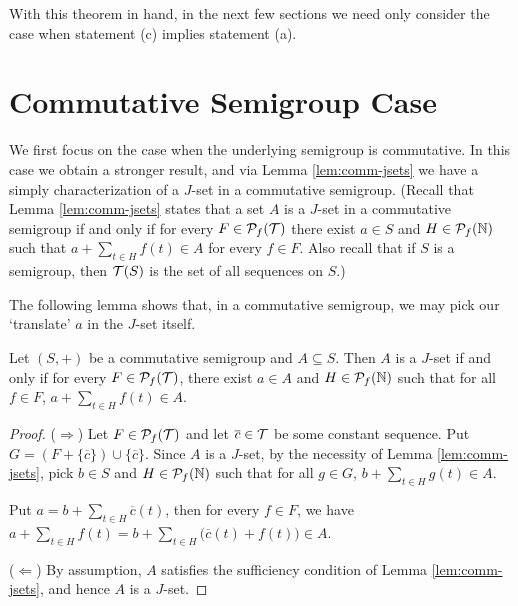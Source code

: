 With this theorem in hand, in the next few sections we need only consider the case when statement (c) implies statement (a).

\section{Commutative Semigroup Case}
We first focus on the case when the underlying semigroup is commutative. 
In this case we obtain a stronger result, and via Lemma \ref{lem:comm-jsets} we have a simply characterization of a $J$-set in a commutative semigroup.
(Recall that Lemma \ref{lem:comm-jsets} states that a set $A$ is a $J$-set in a commutative semigroup if and only if for every $F \in \mathcal{P}_f(\mathcal{T})$ there exist $a \in S$ and $H \in \mathcal{P}_f(\mathbb{N})$ such that $a + \sum_{t \in H} f(t) \in A$ for every $f \in F$.
Also recall that if $S$ is a semigroup, then $\mathcal{T}(S)$ is the set of all sequences on $S$.)


The following lemma shows that, in a commutative semigroup, we may pick our `translate' $a$ in the $J$-set itself.
\begin{lem}
  \label{lem:comm-trans}
  Let $(S, +)$ be a commutative semigroup and $A \subseteq S$.
  Then $A$ is a $J$-set if and only if for every $F \in \mathcal{P}_f(\mathcal{T})$, there exist $a \in A$ and $H \in \mathcal{P}_f(\mathbb{N})$ such that for all $f \in F$, $a + \sum_{t \in H} f(t) \in A$.
\end{lem}
\begin{proof}
  ($\Rightarrow$)
  Let $F \in \mathcal{P}_f(\mathcal{T})$ and let $\overline{c} \in \mathcal{T}$ be some constant sequence.
  Put $G = (F + \{\overline{c}\}) \cup \{\overline{c}\}$. 
  Since $A$ is a $J$-set, by the necessity of Lemma \ref{lem:comm-jsets}, pick $b \in S$ and $H \in \mathcal{P}_f(\mathbb{N})$ such that for all $g \in G$, $b + \sum_{t \in H} g(t) \in A$. 

  Put $a = b + \sum_{t \in H} \overline{c}(t)$, then for every $f \in F$, we have $a + \sum_{t \in H} f(t) = b + \sum_{t \in H}\bigl( \overline{c}(t) + f(t) \bigr) \in A$. 
  
  ($\Leftarrow$)
  By assumption, $A$ satisfies the sufficiency condition of Lemma \ref{lem:comm-jsets}, and hence $A$ is a $J$-set.
\end{proof}

